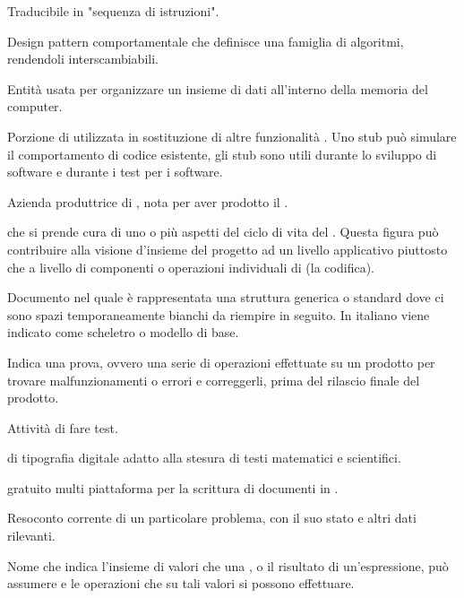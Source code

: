 {Traducibile in "sequenza di istruzioni".}

{Design pattern comportamentale che definisce una famiglia di algoritmi, rendendoli interscambiabili.}

{Entità usata per organizzare un insieme di dati all'interno della memoria del computer.}

{Porzione di  utilizzata in sostituzione di altre funzionalità . Uno stub può simulare il comportamento di codice esistente, gli stub sono utili durante lo sviluppo di software e durante i test per i software.}

{Azienda produttrice di , nota per aver prodotto il  .}

{ che si prende cura di uno o più aspetti del ciclo di vita del . Questa figura può contribuire alla visione d'insieme del progetto ad un livello applicativo piuttosto che a livello di componenti o operazioni individuali di  (la codifica).}




{Documento nel quale è rappresentata una struttura generica o standard dove ci sono spazi temporaneamente bianchi da riempire in seguito. In italiano viene indicato come scheletro o modello di base.}

{Indica una prova, ovvero una serie di operazioni effettuate su un prodotto per trovare malfunzionamenti o errori e correggerli, prima del rilascio finale del prodotto.}

{Attività di fare test.}

{ di tipografia digitale adatto alla stesura di testi matematici e scientifici.}

{ gratuito multi piattaforma per la scrittura di documenti in .}

{Resoconto corrente di un particolare problema, con il suo stato e altri dati rilevanti.}

{Nome che indica l'insieme di valori che una , o il risultato di un'espressione, può assumere e le operazioni che su tali valori si possono effettuare.}

